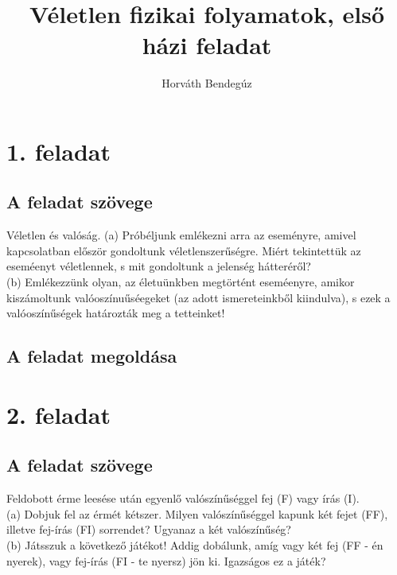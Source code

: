 \documentclass[12pt]{article}
\title{Véletlen fizikai folyamatok, első házi feladat}
\author{Horváth Bendegúz}
\begin{document}
 
 
\maketitle
\section*{1. feladat}
\subsection*{A feladat szövege}
Véletlen és valóság.
(a) Próbéljunk emlékezni arra az eseményre, amivel kapcsolatban először gondoltunk véletlenszerűségre. Miért tekintettük az eseméenyt véletlennek, s mit gondoltunk a jelenség hátteréről?
\\(b) Emlékezzünk olyan, az életuünkben megtörtént eseméenyre, amikor kiszámoltunk valóoszínuűséegeket (az adott ismereteinkből kiindulva), s ezek a valóoszínűségek határozták meg a tetteinket!
\subsection*{A feladat megoldása}
\newpage
\section*{2. feladat}
\subsection*{A feladat szövege}
Feldobott érme leesése után egyenlő valószínűséggel fej (F) vagy írás (I).
\\
(a) Dobjuk fel az érmét kétszer. Milyen valószínűséggel kapunk két fejet (FF), illetve fej-írás (FI) sorrendet? Ugyanaz a két valószínűség?
\\ 
(b) Játsszuk a következő játékot! Addig dobálunk, amíg vagy két fej (FF - én nyerek), vagy fej-írás (FI - te nyersz) jön ki. Igazságos ez a játék?
\end{document}
